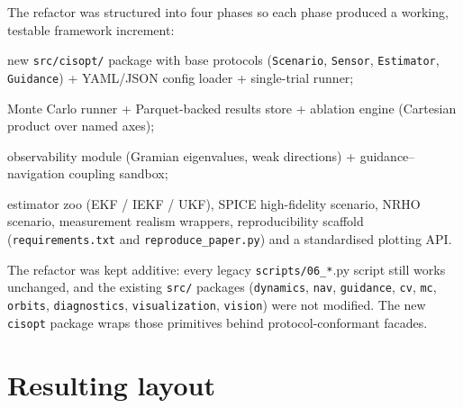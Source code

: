 \documentclass[11pt]{article}
\begin{document}
The refactor was structured into four phases so each phase produced a
working, testable framework increment:

\begin{description}[leftmargin=2em,style=nextline]
\item[Phase A] new \texttt{src/cisopt/} package with base protocols
  (\texttt{Scenario}, \texttt{Sensor}, \texttt{Estimator}, \texttt{Guidance})
  + YAML/JSON config loader + single-trial runner;
\item[Phase B] Monte Carlo runner + Parquet-backed results store + ablation
  engine (Cartesian product over named axes);
\item[Phase C] observability module (Gramian eigenvalues, weak directions)
  + guidance--navigation coupling sandbox;
\item[Phase D] estimator zoo (EKF / IEKF / UKF), SPICE high-fidelity
  scenario, NRHO scenario, measurement realism wrappers, reproducibility
  scaffold (\texttt{requirements.txt} and \texttt{reproduce\_paper.py})
  and a standardised plotting API.
\end{description}

The refactor was kept additive: every legacy \texttt{scripts/06\_*}.py
script still works unchanged, and the existing \texttt{src/} packages
(\texttt{dynamics}, \texttt{nav}, \texttt{guidance}, \texttt{cv},
\texttt{mc}, \texttt{orbits}, \texttt{diagnostics}, \texttt{visualization},
\texttt{vision}) were not modified. The new \texttt{cisopt} package wraps
those primitives behind protocol-conformant facades.

\section{Resulting layout}
\end{document}
